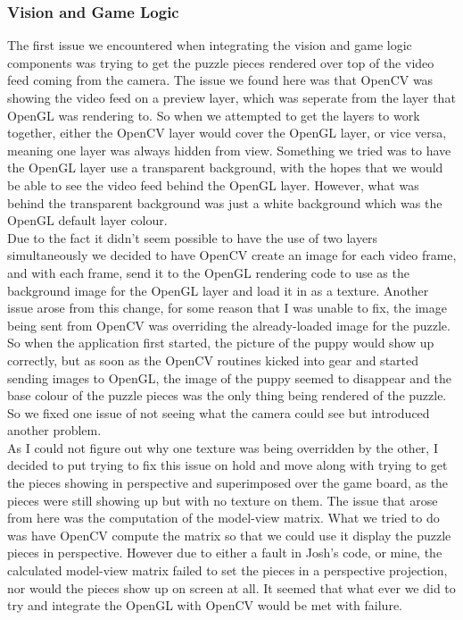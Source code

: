 \documentclass{article}
\begin{document}
\subsubsection{Vision and Game Logic}
The first issue we encountered when integrating the vision and game logic
components was trying to get the puzzle pieces rendered over top of the video feed
coming from the camera. The issue we found here was that OpenCV was showing the
video feed on a preview layer, which was seperate from the layer that OpenGL was
rendering to. So when we attempted to get the layers to work together, either
the OpenCV layer would cover the OpenGL layer, or vice versa, meaning one layer
was always hidden from view. Something we tried was to have the OpenGL layer use
a transparent background, with the hopes that we would be able to see the video
feed behind the OpenGL layer. However, what was behind the transparent
background was just a white background which was the OpenGL default layer
colour.\\

Due to the fact it didn't seem possible to have the use of two layers
simultaneously we decided to have OpenCV create an image for each video frame,
and with each frame, send it to the OpenGL rendering code to use as the
background image for the OpenGL layer and load it in as a texture. Another issue
arose from this change, for some reason that I was unable to fix, the image
being sent from OpenCV was overriding the already-loaded image for the
puzzle. So when the application first started, the picture of the puppy would
show up correctly, but as soon as the OpenCV routines kicked into gear and
started sending images to OpenGL, the image of the puppy seemed to disappear and
the base colour of the puzzle pieces was the only thing being rendered of the
puzzle. So we fixed one issue of not seeing what the camera could see but
introduced another problem.\\

As I could not figure out why one texture was being overridden by the other, I
decided to put trying to fix this issue on hold and move along with trying to
get the pieces showing in perspective and superimposed over the game board, as
the pieces were still showing up but with no texture on them. The issue that
arose from here was the computation of the model-view matrix. What we tried to
do was have OpenCV compute the matrix so that we could use it display the puzzle
pieces in perspective. However due to either a fault in Josh's code, or mine,
the calculated model-view matrix failed to set the pieces in a perspective
projection, nor would the pieces show up on screen at all. It seemed that what
ever we did to try and integrate the OpenGL with OpenCV would be met with
failure.\\
\end{document}
